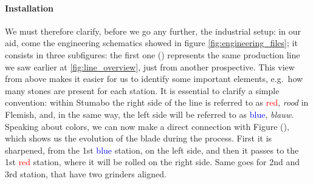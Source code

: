 \paragraph{Installation} We must therefore clarify, before we go any further, the industrial setup: in our aid, come the engineering schematics showed in figure \ref{fig:engineering_files};
it consists in three subfigures: the first one () represents the same production line we saw earlier at \ref{fig:line_overview}, just from another prospective. 
This view from above makes it easier for us to identify some important elements, e.g.\ how many stones are present for each station.
It is essential to clarify a simple convention: within Stumabo the right side of the line is referred to as \textcolor{red}{red}, \textit{rood} in Flemish, and, in the same way, 
the left side will be referred to as \textcolor{blue}{blue}, \textit{blauw}. 
Speaking about colors, we can now make a direct connection with Figure (), which shows us the evolution of the blade during the process.
First it is sharpened, from the 1st \textcolor{blue}{blue} station, on the left side, and then it passes to the 1st \textcolor{red}{red} station, where it will be rolled on the right side. 
Same goes for 2nd and 3rd station, that have two grinders aligned. 


